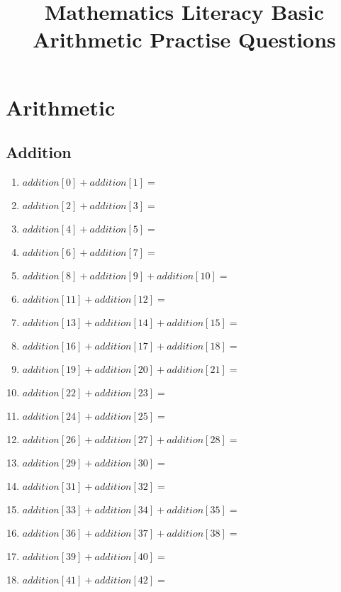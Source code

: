 \documentclass[11pt]{article}
\title{Mathematics Literacy Basic Arithmetic Practise Questions}
\begin{document}
\maketitle

\section{Arithmetic}

\subsection{Addition}
\begin{enumerate}
	\item ${{ addition[0] }} + {{ addition[1] }} =$
	\item ${{ addition[2] }} + {{ addition[3] }} =$
	\item ${{ addition[4] }} + {{ addition[5] }} =$
	\item ${{ addition[6] }} + {{ addition[7] }} =$
	\item ${{ addition[8] }} + {{ addition[9] }} + {{ addition[10] }} =$
	\item ${{ addition[11] }} + {{ addition[12] }} =$
	\item ${{ addition[13] }} + {{ addition[14] }} + {{ addition[15] }} =$
	\item ${{ addition[16] }} + {{ addition[17] }} + {{ addition[18] }} =$
	\item ${{ addition[19] }} + {{ addition[20] }} + {{ addition[21] }} =$
	\item ${{ addition[22] }} + {{ addition[23] }} =$
	\item ${{ addition[24] }} + {{ addition[25] }} =$
	\item ${{ addition[26] }} + {{ addition[27] }} + {{ addition[28] }} =$
	\item ${{ addition[29] }} + {{ addition[30] }} =$
	\item ${{ addition[31] }} + {{ addition[32] }} =$
	\item ${{ addition[33] }} + {{ addition[34] }} + {{ addition[35] }} =$
	\item ${{ addition[36] }} + {{ addition[37] }} + {{ addition[38] }} =$
	\item ${{ addition[39] }} + {{ addition[40] }} =$
	\item ${{ addition[41] }} + {{ addition[42] }} =$
\end{enumerate}

\clearpage
\end{document}
